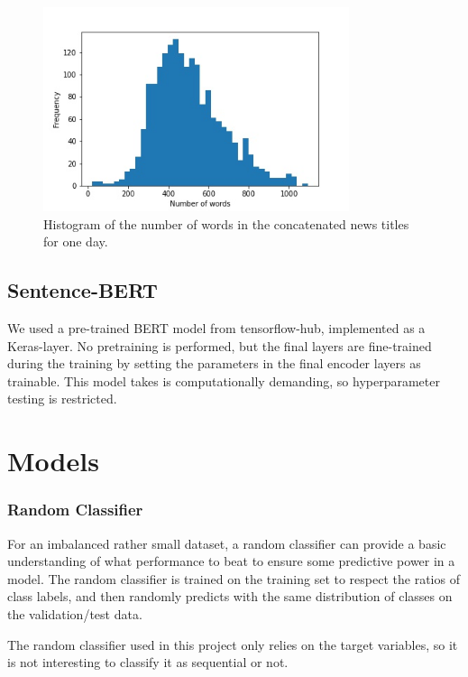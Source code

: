 \begin{figure}[ht]
\centering
\includegraphics[width=0.8\textwidth]{Figures/wordcount.jpg}
\caption{Histogram of the number of words in the concatenated news titles for one day. }
\label{fig:num_words}
\end{figure}

\subsection{Sentence-BERT}

We used a pre-trained BERT model from tensorflow-hub, implemented as a Keras-layer. No pretraining is performed, but the final layers are fine-trained during the training by setting the parameters in the final encoder layers as trainable. This model takes is computationally demanding, so hyperparameter testing is restricted. 


\section{Models}

\subsubsection{Random Classifier}

For an imbalanced rather small dataset, a random classifier can provide a basic understanding of what performance to beat to ensure some predictive power in a model. The random classifier is trained on the training set to respect the ratios of class labels, and then randomly predicts with the same distribution of classes on the validation/test data. 

The random classifier used in this project only relies on the target variables, so it is not interesting to classify it as sequential or not.  

